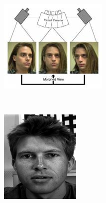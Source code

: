 \begin{figure}
  \begin{subfigure}[b]{0.24\textwidth}
    \centering
    \includegraphics[width=\textwidth]{images/three-view.png}
    \caption{}
  \end{subfigure}
  ~
  \begin{subfigure}[b]{0.2\textwidth}
    \centering
    \includegraphics[width=\textwidth]{images/input-face.png}

\end{subfigure}
\end{figure}
